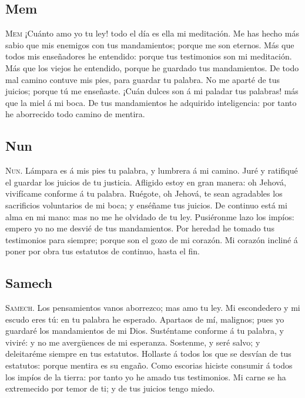\hypertarget{mem}{%
\subsection{Mem}\label{mem}}

 \textsc{Mem} ¡Cuánto amo yo tu ley! todo el día es ella
mi meditación.  Me has hecho más sabio que mis enemigos
con tus mandamientos; porque me son eternos.  Más que
todos mis enseñadores he entendido: porque tus testimonios son mi
meditación.  Más que los viejos he entendido, porque he
guardado tus mandamientos.  De todo mal camino contuve
mis pies, para guardar tu palabra.  No me aparté de tus
juicios; porque tú me enseñaste.  ¡Cuán dulces son á mi
paladar tus palabras! más que la miel á mi boca.  De tus
mandamientos he adquirido inteligencia: por tanto he aborrecido todo
camino de mentira.

\hypertarget{nun}{%
\subsection{Nun}\label{nun}}

 \textsc{Nun}. Lámpara es á mis pies tu palabra, y
lumbrera á mi camino.  Juré y ratifiqué el guardar los
juicios de tu justicia.  Afligido estoy en gran manera:
oh Jehová, vivifícame conforme á tu palabra.  Ruégote,
oh Jehová, te sean agradables los sacrificios voluntarios de mi boca; y
enséñame tus juicios.  De continuo está mi alma en mi
mano: mas no me he olvidado de tu ley.  Pusiéronme lazo
los impíos: empero yo no me desvié de tus mandamientos. 
Por heredad he tomado tus testimonios para siempre; porque son el gozo
de mi corazón.  Mi corazón incliné á poner por obra tus
estatutos de continuo, hasta el fin.

\hypertarget{samech}{%
\subsection{Samech}\label{samech}}

 \textsc{Samech}. Los pensamientos vanos aborrezco; mas
amo tu ley.  Mi escondedero y mi escudo eres tú: en tu
palabra he esperado.  Apartaos de mí, malignos; pues yo
guardaré los mandamientos de mi Dios.  Susténtame
conforme á tu palabra, y viviré: y no me avergüences de mi esperanza.
 Sostenme, y seré salvo; y deleitaréme siempre en tus
estatutos.  Hollaste á todos los que se desvían de tus
estatutos: porque mentira es su engaño.  Como escorias
hiciste consumir á todos los impíos de la tierra: por tanto yo he amado
tus testimonios.  Mi carne se ha extremecido por temor
de ti; y de tus juicios tengo miedo.

